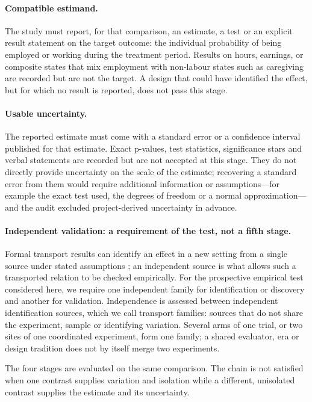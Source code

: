 \documentclass[11pt]{article}
\begin{document}
\paragraph{Compatible estimand.} The study must report, for that comparison, an estimate, a test or an explicit result statement on the target outcome: the individual probability of being employed or working during the treatment period. Results on hours, earnings, or composite states that mix employment with non-labour states such as caregiving are recorded but are not the target. A design that could have identified the effect, but for which no result is reported, does not pass this stage.

\paragraph{Usable uncertainty.} The reported estimate must come with a standard error or a confidence interval published for that estimate. Exact p-values, test statistics, significance stars and verbal statements are recorded but are not accepted at this stage. They do not directly provide uncertainty on the scale of the estimate; recovering a standard error from them would require additional information or assumptions---for example the exact test used, the degrees of freedom or a normal approximation---and the audit excluded project-derived uncertainty in advance.

\paragraph{Independent validation: a requirement of the test, not a fifth stage.} Formal transport results can identify an effect in a new setting from a single source under stated assumptions \citep{pearl2014}; an independent source is what allows such a transported relation to be checked empirically. For the prospective empirical test considered here, we require one independent family for identification or discovery and another for validation. Independence is assessed between independent identification sources, which we call transport families: sources that do not share the experiment, sample or identifying variation. Several arms of one trial, or two sites of one coordinated experiment, form one family; a shared evaluator, era or design tradition does not by itself merge two experiments.

The four stages are evaluated on the same comparison. The chain is not satisfied when one contrast supplies variation and isolation while a different, unisolated contrast supplies the estimate and its uncertainty.
\end{document}

